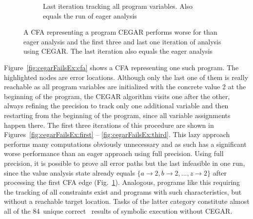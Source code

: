 \begin{figure}
\begin{subfigure}[b]{.48\textwidth}
\caption{Last iteration tracking all program variables. Also equals the run of eager analysis}
\label{fig:cegarFailsEx:eager}
\end{subfigure}
\caption{A CFA representing a program CEGAR performs worse for than eager analysis and the first three
and last one iteration of analysis using CEGAR. The last iteration also equals the eager analysis}
\label{fig:cegarFailsEx}
\end{figure}

Figure~\ref{fig:cegarFailsEx:cfa} shows a CFA representing one such program. The highlighted nodes are error locations.
Although only the last one of them is really reachable as all program variables are initialized with the concrete value $2$ at the beginning of the program,
the CEGAR algorithm visits one after the other, always refining the precision to track only one additional variable and then restarting
from the beginning of the program, since all variable assignments happen there.
The first three iterations of this procedure are shown in Figures~\ref{fig:cegarFailsEx:first} -- \ref{fig:cegarFailsEx:third}.
This lazy approach performs many computations obviously unnecessary and as such has a significant worse performance than an eager approach using full precision.
Using full precision, it is possible to prove all error paths but the last infeasible in one run, since the value analysis state already equals $\{ a \rightarrow 2, b \rightarrow 2, ..., z \rightarrow 2 \}$ after processing the first CFA edge (Fig.~\ref{fig:cegarFailsEx:eager}).
Analogous, programs like this requiring the tracking of all constraints exist and programs with such characteristics, but without a reachable target location.
Tasks of the latter category constitute almost all of the 84~unique correct \resultTrue\ results of symbolic execution without CEGAR.

